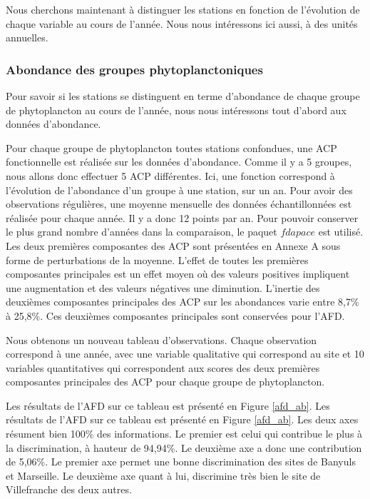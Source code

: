 \documentclass[12pt]{article}
\begin{document}
Nous cherchons maintenant à distinguer les stations en fonction de l’évolution de chaque variable au cours de l’année. Nous nous intéressons ici aussi, à des unités annuelles. 

\subsubsection{Abondance des groupes phytoplanctoniques}

Pour savoir si les stations se distinguent en terme d'abondance de chaque groupe de phytoplancton au cours de l'année, nous nous intéressons tout d'abord aux données d'abondance. 

Pour chaque groupe de phytoplancton toutes stations confondues, une ACP fonctionnelle est réalisée sur les données d’abondance. Comme il y a 5 groupes, nous allons donc effectuer 5 ACP différentes. Ici, une fonction correspond à l’évolution de l’abondance d'un groupe à une station, sur un an. Pour avoir des observations régulières, une moyenne mensuelle des données échantillonnées est réalisée pour chaque année. Il y a donc 12 points par an. Pour pouvoir conserver le plus grand nombre d’années dans la comparaison, le paquet $fdapace$ est utilisé. Les deux premières composantes des ACP sont présentées en Annexe A sous forme de perturbations de la moyenne. L’effet de toutes les premières composantes principales est un effet moyen où des valeurs positives impliquent une augmentation et des valeurs négatives une diminution. L’inertie des deuxièmes composantes principales des ACP sur les abondances varie entre 8,7\% à 25,8\%. Ces deuxièmes composantes principales sont conservées pour l’AFD.

Nous obtenons un nouveau tableau d’observations. Chaque observation correspond à une année, avec une variable qualitative qui correspond au site et 10 variables quantitatives qui correspondent aux scores des deux premières composantes principales des ACP pour chaque groupe de phytoplancton. 

Les résultats de l’AFD sur ce tableau est présenté en Figure \ref{afd_ab}. Les résultats de l’AFD sur ce tableau est présenté en Figure \ref{afd_ab}. Les deux axes résument bien 100\% des informations. Le premier est celui qui contribue le plus à la discrimination, à hauteur de 94,94\%. Le deuxième axe a donc une contribution de 5,06\%. Le premier axe permet une bonne discrimination des sites de Banyuls et Marseille. Le deuxième axe quant à lui, discrimine très bien le site de Villefranche des deux autres. 
\end{document}
